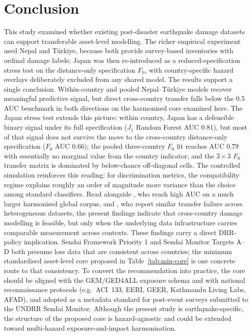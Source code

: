 \documentclass[11pt,a4paper]{article}
\begin{document}
\section{Conclusion}
\label{sec:conclusion}

This study examined whether existing post-disaster earthquake damage datasets can support transferable asset-level modelling. The richer empirical experiment used Nepal and T\"urkiye, because both provide survey-based inventories with ordinal damage labels; Japan was then re-introduced as a reduced-specification stress test on the distance-only specification $F_0$, with country-specific hazard overlays deliberately excluded from any shared model.
The results support a single conclusion. Within-country and pooled Nepal--T\"urkiye models recover meaningful predictive signal, but direct cross-country transfer falls below the 0.5 AUC benchmark in both directions on the harmonised core examined here. The Japan stress test extends this picture: within country, Japan has a defensible binary signal under its full specification ($J_1$ Random Forest AUC $0.81$), but most of that signal does not survive the move to the cross-country distance-only specification ($F_0$ AUC $0.66$); the pooled three-country $F_0$ fit reaches AUC $0.79$ with essentially no marginal value from the country indicator; and the $3\times 3$ $F_0$ transfer matrix is dominated by below-chance off-diagonal cells. The controlled simulation reinforces this reading: for discrimination metrics, the compatibility regime explains roughly an order of magnitude more variance than the choice among standard classifiers. Read alongside \citet{patten2024datadriven}, who reach high AUC on a much larger harmonised global corpus, and \citet{ghimire2024host}, who report similar transfer failure across heterogeneous datasets, the present findings indicate that cross-country damage modelling is feasible, but only when the underlying data infrastructure carries comparable measurement across contexts.
These findings carry a direct DRR-policy implication. Sendai Framework Priority 1 and Sendai Monitor Targets A--D both presume loss data that are consistent across countries; the minimum standardised asset-level core proposed in Table~\ref{tab:min-core} is one concrete route to that consistency. To convert the recommendation into practice, the core should be aligned with the GEM/GED4ALL exposure schema \citep{silva2022buildingclass, yepes2023exposure} and with national reconnaissance protocols (e.g.\ ACI~133, EERI, GEER, Kathmandu Living Labs, AFAD), and adopted as a metadata standard for post-event surveys submitted to the UNDRR Sendai Monitor. Although the present study is earthquake-specific, the structure of the proposed core is hazard-agnostic and could be extended toward multi-hazard exposure-and-impact harmonisation.
\end{document}
